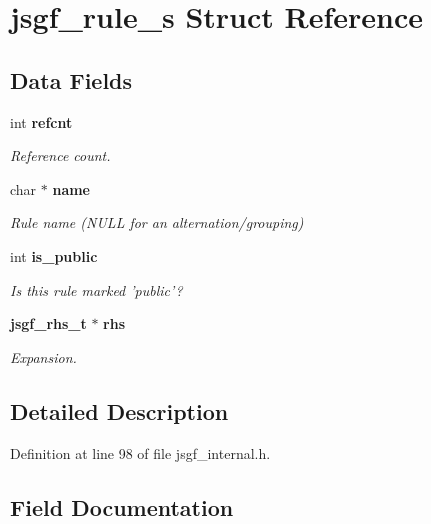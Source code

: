 \section{jsgf\-\_\-rule\-\_\-s Struct Reference}
\label{structjsgf__rule__s}
\subsection*{Data Fields}
\begin{DoxyCompactItemize}
\item 
int {\bf refcnt}
\begin{DoxyCompactList}\small\item\em Reference count. \end{DoxyCompactList}\item 
char $\ast$ {\bf name}\label{structjsgf__rule__s_a1b1de5afa4c0f27df4e8d51ebc47ca92}

\begin{DoxyCompactList}\small\item\em Rule name (N\-U\-L\-L for an alternation/grouping) \end{DoxyCompactList}\item 
int {\bf is\-\_\-public}\label{structjsgf__rule__s_a36478d9850594d6a201c6724ec1f1fa4}

\begin{DoxyCompactList}\small\item\em Is this rule marked 'public'? \end{DoxyCompactList}\item 
{\bf jsgf\-\_\-rhs\-\_\-t} $\ast$ {\bf rhs}\label{structjsgf__rule__s_a6923b74ad72f8b663cc00dfa99490981}

\begin{DoxyCompactList}\small\item\em Expansion. \end{DoxyCompactList}\end{DoxyCompactItemize}


\subsection{Detailed Description}


Definition at line 98 of file jsgf\-\_\-internal.\-h.



\subsection{Field Documentation}
